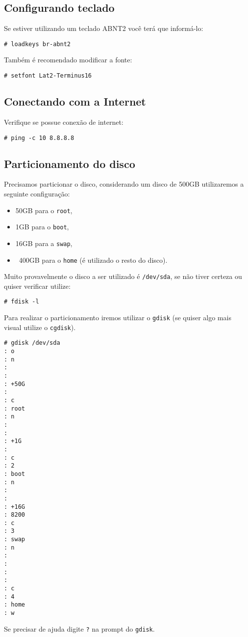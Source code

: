 \documentclass[A4paper]{article}
\begin{document}
\subsection{Configurando teclado}
Se estiver utilizando um teclado ABNT2 você terá que informá-lo:
\begin{lstlisting}
# loadkeys br-abnt2
\end{lstlisting}
Também é recomendado modificar a fonte:
\begin{lstlisting}
# setfont Lat2-Terminus16
\end{lstlisting}

\subsection{Conectando com a Internet}
Verifique se possue conexão de internet:
\begin{lstlisting}
# ping -c 10 8.8.8.8
\end{lstlisting}

\subsection{Particionamento do disco}
Precisamos particionar o disco, considerando um disco de 500GB utilizaremos a
seguinte configuração:
\begin{itemize}
  \item 50GB para o \lstinline+root+,
  \item 1GB para o \lstinline+boot+,
  \item 16GB para a \lstinline+swap+,
  \item ~400GB para o \lstinline+home+ (é utilizado o resto do disco).
\end{itemize}

Muito provavelmente o disco a ser utilizado é \lstinline+/dev/sda+, se não tiver
certeza ou quiser verificar utilize:
\begin{lstlisting}
# fdisk -l
\end{lstlisting}

Para realizar o particionamento iremos utilizar o \lstinline+gdisk+ (se quiser
algo mais visual utilize o \lstinline+cgdisk+).
\begin{lstlisting}
# gdisk /dev/sda
: o
: n
:
:
: +50G
:
: c
: root
: n
:
:
: +1G
:
: c
: 2
: boot
: n
:
:
: +16G
: 8200
: c
: 3
: swap
: n
:
:
:
:
: c
: 4
: home
: w
\end{lstlisting}
Se precisar de ajuda digite \lstinline+?+ na prompt do \lstinline+gdisk+.
\end{document}
